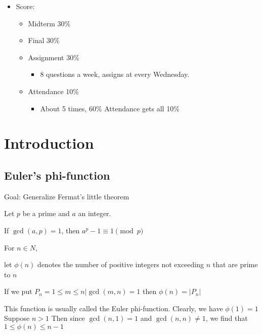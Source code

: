 

\begin{itemize}
    \item Score:
    \begin{itemize}
        \item Midterm 30\%
        \item Final 30\%
        \item Assignment 30\%
        \begin{itemize}
            \item 8 questions a week, assigns at every Wednesday.
        \end{itemize}
        \item Attendance 10\%
        \begin{itemize}
            \item About 5 times, 60\% Attendance gets all 10\%
        \end{itemize}
    \end{itemize}
\end{itemize}


\setcounter{chapter}{6}
\chapter{Introduction}

\setcounter{section}{1}
\section{Euler's phi-function}
Goal: Generalize Fermat's little theorem

\begin{theorem}
    Let $p$ be a prime and $a$ an integer.

    If $\gcd(a, p) = 1$, then $a^p-1 \equiv 1 \pmod p$
\end{theorem}

\begin{definition}{}
    For $n \in N$, 
    
    let $\phi(n)$ denotes the number of positive integers not exceeding $n$ that are prime to $n$
\end{definition}
\begin{eg}
    If we put $P_n={1 \leq m \leq n | \gcd(m, n) = 1}$ then $\phi(n) = |P_n|$
\end{eg}

\begin{remark}
    This function is usually called the Euler phi-function.
    Clearly, we have $\phi(1) = 1$
    Suppose $n > 1$ Then since $\gcd(n, 1) = 1$ and $\gcd(n, n) \neq 1$, we find that $1 \leq \phi(n) \leq n-1$
\end{remark}


